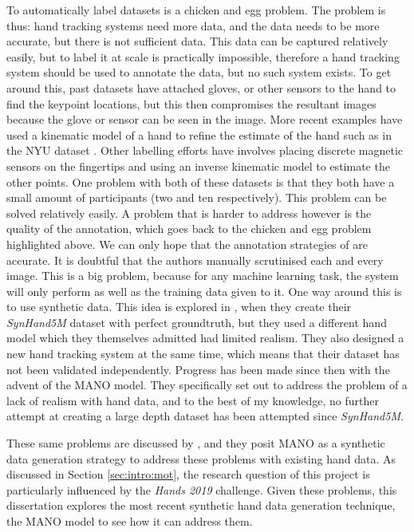 To automatically label datasets is a chicken and egg problem. The problem is thus: hand tracking systems need more data, and the data needs to be more accurate, but there is not sufficient data. This data can be captured relatively easily, but to label it at scale is practically impossible, therefore a hand tracking system should be used to annotate the data, but no such system exists. To get around this, past datasets have attached gloves, or other sensors to the hand to find the keypoint locations, but this then compromises the resultant images because the glove or sensor can be seen in the image. More recent examples have used a kinematic model of a hand to refine the estimate of the hand such as in the NYU dataset \cite{tompson2014real}. Other labelling efforts have involves placing discrete magnetic sensors on the fingertips and using an inverse kinematic model to estimate the other points\cite{yuan2017bighand2}. One problem with both of these datasets is that they both have a small amount of participants (two and ten respectively). This problem can be solved relatively easily. A problem that is harder to address however is the quality of the annotation, which goes back to the chicken and egg problem highlighted above. We can only hope that the annotation strategies of \cite{tompson2014real, yuan2017bighand2} are accurate. It is doubtful that the authors manually scrutinised each and every image. This is a big problem, because for any machine learning task, the system will only perform as well as the training data given to it. One way around this is to use synthetic data. This idea is explored in \cite{malik2018deephps}, when they create their {\slshape SynHand5M} dataset with perfect groundtruth, but they used a different hand model which they themselves admitted had limited realism. They also designed a new hand tracking system at the same time,  which means that their dataset has not been validated independently. Progress has been made since then with the advent of the MANO model\cite{romero2017embodied}. They specifically set out to address the problem of a lack of realism with hand data, and to the best of my knowledge, no further attempt at creating a large depth dataset has been attempted since {\slshape SynHand5M}.

These same problems are discussed by \cite{armagan2020measuring}, and they posit MANO as a synthetic data generation strategy to address these problems with existing hand data. As discussed in Section \ref{sec:intro:mot}, the research question of this project is particularly influenced by the {\slshape Hands 2019} challenge. Given these problems, this dissertation explores the most recent synthetic hand data generation technique, the MANO model to see how it can address them.

